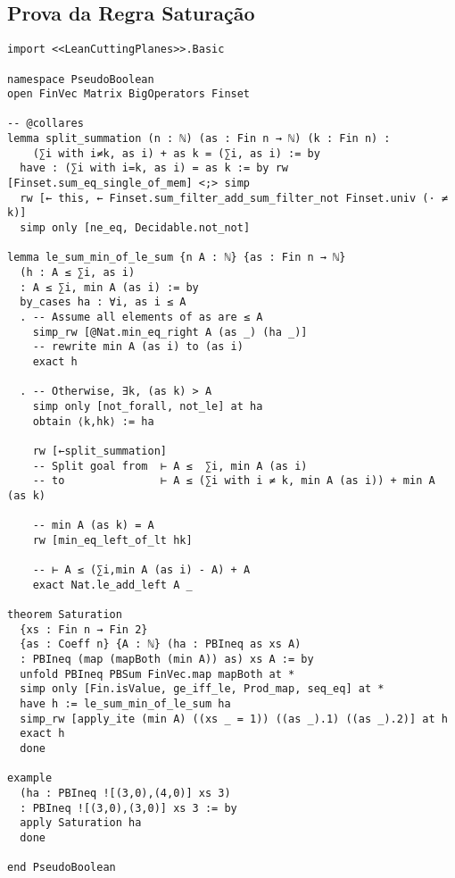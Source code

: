 \documentclass[conference]{IEEEtran}
\begin{document}
\subsection{Prova da Regra Saturação}
\begin{verbatim}
import <<LeanCuttingPlanes>>.Basic

namespace PseudoBoolean
open FinVec Matrix BigOperators Finset

-- @collares
lemma split_summation (n : ℕ) (as : Fin n → ℕ) (k : Fin n) :
    (∑i with i≠k, as i) + as k = (∑i, as i) := by
  have : (∑i with i=k, as i) = as k := by rw [Finset.sum_eq_single_of_mem] <;> simp
  rw [← this, ← Finset.sum_filter_add_sum_filter_not Finset.univ (· ≠ k)]
  simp only [ne_eq, Decidable.not_not]

lemma le_sum_min_of_le_sum {n A : ℕ} {as : Fin n → ℕ}
  (h : A ≤ ∑i, as i)
  : A ≤ ∑i, min A (as i) := by
  by_cases ha : ∀i, as i ≤ A
  . -- Assume all elements of as are ≤ A
    simp_rw [@Nat.min_eq_right A (as _) (ha _)]
    -- rewrite min A (as i) to (as i)
    exact h

  . -- Otherwise, ∃k, (as k) > A
    simp only [not_forall, not_le] at ha
    obtain ⟨k,hk⟩ := ha

    rw [←split_summation]
    -- Split goal from  ⊢ A ≤  ∑i, min A (as i)
    -- to               ⊢ A ≤ (∑i with i ≠ k, min A (as i)) + min A (as k)

    -- min A (as k) = A
    rw [min_eq_left_of_lt hk]

    -- ⊢ A ≤ (∑i,min A (as i) - A) + A
    exact Nat.le_add_left A _

theorem Saturation
  {xs : Fin n → Fin 2}
  {as : Coeff n} {A : ℕ} (ha : PBIneq as xs A)
  : PBIneq (map (mapBoth (min A)) as) xs A := by
  unfold PBIneq PBSum FinVec.map mapBoth at *
  simp only [Fin.isValue, ge_iff_le, Prod_map, seq_eq] at *
  have h := le_sum_min_of_le_sum ha
  simp_rw [apply_ite (min A) ((xs _ = 1)) ((as _).1) ((as _).2)] at h
  exact h
  done

example
  (ha : PBIneq ![(3,0),(4,0)] xs 3)
  : PBIneq ![(3,0),(3,0)] xs 3 := by
  apply Saturation ha
  done

end PseudoBoolean
\end{verbatim}
\newpage
\end{document}
